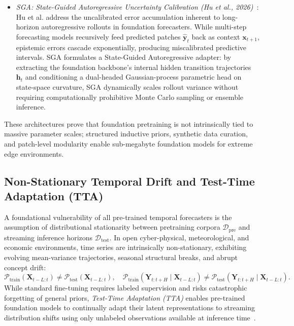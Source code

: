 \begin{itemize}[leftmargin=*]
\begin{equation}
    \end{equation}
    using a single shared transformation layer ($0.3\text{M}$ parameters). Q-DEQ resolves the numerical divergence that standard fixed-point Broyden solvers experience under discrete INT4/INT8 arithmetic by formulating a discrete-solving relaxation and contraction-mapping boundary constraint. Q-DEQ achieves parity with full-precision FP32 PatchTST and DLinear baselines while cutting memory storage to $75\text{ KB}$, enabling continuous dynamical equilibrium modeling within microcontroller cache bounds.
    \item \emph{SGA: State-Guided Autoregressive Uncertainty Calibration (Hu et al., 2026)}~\cite{hu2026sga}: Hu et al. address the uncalibrated error accumulation inherent to long-horizon autoregressive rollouts in foundation forecasters. While multi-step forecasting models recursively feed predicted patches $\hat{\mathbf{y}}_t$ back as context $\mathbf{x}_{t+1}$, epistemic errors cascade exponentially, producing miscalibrated predictive intervals. SGA formulates a State-Guided Autoregressive adapter: by extracting the foundation backbone's internal hidden transition trajectories $\mathbf{h}_t$ and conditioning a dual-headed Gaussian-process parametric head on state-space curvature, SGA dynamically scales rollout variance without requiring computationally prohibitive Monte Carlo sampling or ensemble inference.
\end{itemize}
These architectures prove that foundation pretraining is not intrinsically tied to massive parameter scales; structured inductive priors, synthetic data curation, and patch-level modularity enable sub-megabyte foundation models for extreme edge environments.

\subsection{Non-Stationary Temporal Drift and Test-Time Adaptation (TTA)}
\label{sec:test_time_adaptation}

A foundational vulnerability of all pre-trained temporal forecasters is the assumption of distributional stationarity between pretraining corpora $\mathcal{D}_{\text{pre}}$ and streaming inference horizons $\mathcal{D}_{\text{test}}$. In open cyber-physical, meteorological, and economic environments, time series are intrinsically non-stationary, exhibiting evolving mean-variance trajectories, seasonal structural breaks, and abrupt concept drift:
\begin{equation}
    \mathcal{P}_{\text{train}}(\mathbf{X}_{t-L:t}) \neq \mathcal{P}_{\text{test}}(\mathbf{X}_{t-L:t}), \quad \mathcal{P}_{\text{train}}(\mathbf{Y}_{t:t+H} \mid \mathbf{X}_{t-L:t}) \neq \mathcal{P}_{\text{test}}(\mathbf{Y}_{t:t+H} \mid \mathbf{X}_{t-L:t}).
\end{equation}
While standard fine-tuning requires labeled supervision and risks catastrophic forgetting of general priors, \emph{Test-Time Adaptation (TTA)} enables pre-trained foundation models to continually adapt their latent representations to streaming distribution shifts using only unlabeled observations available at inference time~\cite{kim2025battling,dang2026adanodes}.

